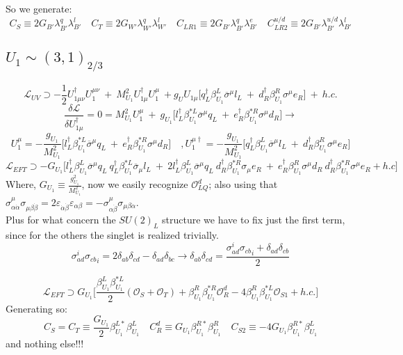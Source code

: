 \documentclass{article}
\begin{document}
So we generate:
\[
C_S\equiv  2 G_{B'} \lambda_{B'}^q \lambda_{B'}^l \quad C_T \equiv 2G_{W'} \lambda_{W'}^q \lambda_{W'}^l \quad C_{LR1} \equiv 2 G_{B'} \lambda_{B'}^q \lambda_{B'}^e \quad C_{LR2}^{u/d} \equiv 2 G_{B'} \lambda_{B'}^{u/d} \lambda_{B'}^l
\]


\subsection{$U_1 \sim (3,1)_{2/3}$}
\[
\mathcal{L}_{UV} \supset -\frac{1}{2} U_{1\mu \nu}^\dagger U^{\mu \nu}_1 \ + \ M_{U_1}^2 U^\dagger_{1\mu}U_1^\mu  \ +
g_U U_{1\mu} \big[ q_L^\dagger \beta^L_{U_1} \overline{\sigma}^\mu l_L \ +  \ d_R^\dagger \beta^R_{U_1} \sigma^\mu e_R \big] \ + \ h.c. 
\]
\[
\frac{\delta \mathcal{L}}{\delta U_{1\mu}^\dagger} = 0 = M_{U_1}^2 U_1^\mu \ +\ g_{U_1} \big[ l_L^\dagger \beta^{*L}_{U_1} \overline{\sigma}^\mu q_L \ +  \ e_R^\dagger \beta^{*R}_{U_1} \sigma^\mu d_R\big] \rightarrow
\]
\[
U^\mu_1 = - \frac{g_{U_1}}{M^2_{U_1}} \big[ l_L^\dagger \beta^{*L}_{U_1} \overline{\sigma}^\mu q_L \ +  \ e_R^\dagger \beta^{*R}_{U_1} \sigma^\mu d_R \big] \quad, U^{\mu \dagger}_1 = -\frac{g_{U_1}}{M^2_{U_1}} \big[ q_L^\dagger \beta^L_{U_1} \overline{\sigma}^\mu l_L \ +  \ d_R^\dagger \beta^R_{U_1} \sigma^\mu e_R \big] 
\]
\[
\mathcal{L}_{EFT} \supset -G_{U_1}\big[ l_L^\dagger \beta^L_{U_1} \overline{\sigma}^\mu q_L \ q_L^\dagger \beta^{*L}_{U_1} \overline{\sigma}_\mu l_L \ +\  2l_L^\dagger \beta^L_{U_1} \overline{\sigma}^\mu q_L  \ d_R^\dagger \beta^{*R}_{U_1} \sigma_\mu e_R \  + \ e_R^\dagger \beta^R_{U_1} \sigma^\mu d_R \  d_R^\dagger \beta^{*R}_{U_1} \sigma^\mu e_R + h.c \big]
\]
Where, $G_{U_1} \equiv \frac{g^2_{U_1}}{M^2_{U_1}}$, now we easily recognize $\mathcal{O}^d_{LQ}$; also using that \\ $\sigma^\mu_{\alpha\dot{\alpha}} \sigma_{\mu\beta \dot{\beta}}=2 \varepsilon_{\dot{\alpha} \dot{\beta}} \varepsilon_{\alpha \beta}=- \sigma^\mu_{\alpha\dot{\beta}} \sigma_{\mu\beta \dot{\alpha}}$.\\
Plus for what concern the $SU(2)_L$ structure we have to fix just the first term, since for the others the singlet is realized trivially.
\[
\sigma^i_{ad} {\sigma_{cb}}_i = 2 \delta_{ab} \delta_{cd}- \delta_{ad}  \delta_{bc} \rightarrow \delta_{ab}\delta_{cd} = \frac{\sigma^i_{ad} {\sigma_{cb}}_i + \delta_{ad} \delta_{cb}}{2}
\]

\[
\mathcal{L}_{EFT} \supset G_{U_1}\big[\frac{\beta_{U_1}^L \beta_{U_1}^{*L}}{2}(\mathcal{O}_{S} + \mathcal{O}_{T}) + \beta_{U_1}^R \beta_{U_1}^{*R} \mathcal{O}^d_{R} - 4 \beta_{U_1}^R \beta_{U_1}^{*L} \mathcal{O}_{S1} + h.c.]
\]
Generating so:
\[
C_S = C_T \equiv \frac{G_{U_1}}{2} \beta_{U_1}^{L*} \beta_{U_1}^L \quad  C_R^d \equiv G_{U_1} \beta_{U_1}^{R*} \beta_{U_1}^R  \quad C_{S2} \equiv - 4 G_{U_1} \beta_{U_1}^{R*} \beta_{U_1}^L 
\]
and nothing else!!!
\end{document}
